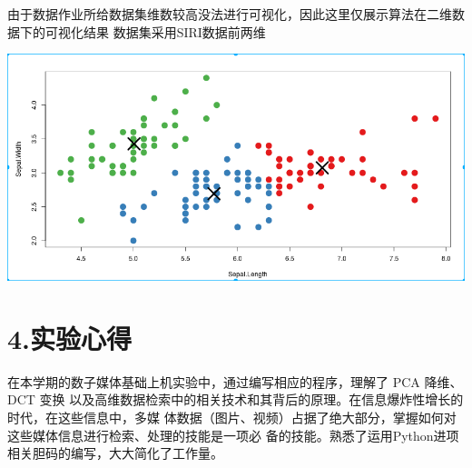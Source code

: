 \documentclass[a4paper, 12pt]{ctexart}
\begin{document}
\noindent{}由于数据作业所给数据集维数较高没法进行可视化，因此这里仅展示算法在二维数据下的可视化结果
数据集采用SIRI数据前两维%

\includegraphics[keepaspectratio=true,width=\dimmin{}{\dimwidth{0.90}}]{images/kmeans}{}%

\section{4.\hspace*{0.5em}实验心得}\label{section}%

\noindent{}在本学期的数⼦媒体基础上机实验中，通过编写相应的程序，理解了 PCA 降维、DCT 变换
以及⾼维数据检索中的相关技术和其背后的原理。在信息爆炸性增长的时代，在这些信息中，多媒
体数据（图⽚、视频）占据了绝⼤部分，掌握如何对这些媒体信息进⾏检索、处理的技能是⼀项必
备的技能。熟悉了运用Python进项相关胆码的编写，大大简化了工作量。%
\end{document}
